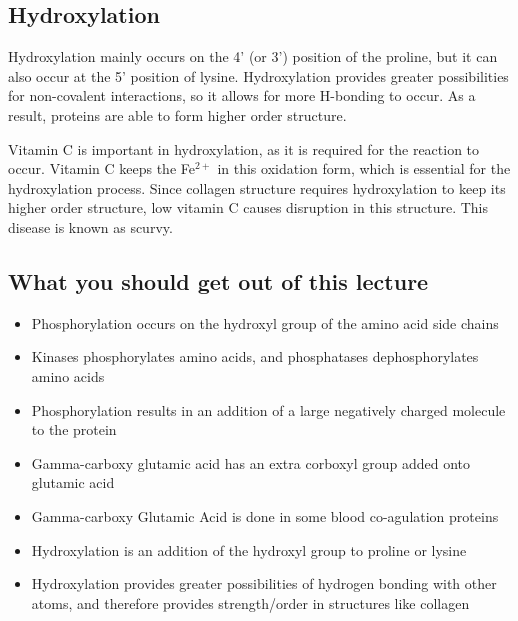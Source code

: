 \subsection{Hydroxylation}

Hydroxylation mainly occurs on the 4' (or 3') position of the proline, but it can also occur at the 5' position of lysine.
Hydroxylation provides greater possibilities for non-covalent interactions, so it allows for more H-bonding to occur.
As a result, proteins are able to form higher order structure.

Vitamin C is important in hydroxylation, as it is required for the reaction to occur.
Vitamin C keeps the Fe$^{2+}$ in this oxidation form, which is essential for the hydroxylation process.
Since collagen structure requires hydroxylation to keep its higher order structure, low vitamin C causes disruption in this structure.
This disease is known as scurvy.

\subsection*{What you should get out of this lecture}

\begin{itemize}
	\item Phosphorylation occurs on the hydroxyl group of the amino acid side chains
	\item Kinases phosphorylates amino acids, and phosphatases dephosphorylates amino acids
	\item Phosphorylation results in an addition of a large negatively charged molecule to the protein
	\item Gamma-carboxy glutamic acid has an extra corboxyl group added onto glutamic acid
	\item Gamma-carboxy Glutamic Acid is done in some blood co-agulation proteins
	\item Hydroxylation is an addition of the hydroxyl group to proline or lysine
	\item Hydroxylation provides greater possibilities of hydrogen bonding with other atoms, and therefore provides strength/order in structures like collagen
\end{itemize}

